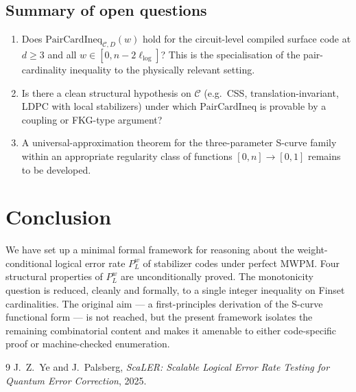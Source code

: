 \documentclass[11pt]{article}
\theoremstyle{definition}
\theoremstyle{remark}
\begin{document}
\subsection{Summary of open questions}

\begin{enumerate}
\item Does $\mathrm{PairCardIneq}_{\mathcal{C}, D}(w)$ hold for
the circuit-level compiled surface code at $d \geq 3$ and all
$w \in [0, n - 2\ell_{\log}]$?  This is the specialisation of the
pair-cardinality inequality to the physically relevant setting.
\item Is there a clean structural hypothesis on $\mathcal{C}$
(e.g.\ CSS, translation-invariant, LDPC with local stabilizers)
under which $\mathrm{PairCardIneq}$ is provable by a coupling or
FKG-type argument?
\item A universal-approximation theorem for the three-parameter
S-curve family within an appropriate regularity class of functions
$[0, n] \to [0, 1]$ remains to be developed.
\end{enumerate}

\section{Conclusion}

We have set up a minimal formal framework for reasoning about the
weight-conditional logical error rate $P_L^w$ of stabilizer codes
under perfect MWPM.  Four structural properties of $P_L^w$ are
unconditionally proved.  The monotonicity question is reduced,
cleanly and formally, to a single integer inequality on Finset
cardinalities.  The original aim --- a first-principles derivation
of the S-curve functional form --- is not reached, but the
present framework isolates the remaining combinatorial content and
makes it amenable to either code-specific proof or machine-checked
enumeration.

\begin{thebibliography}{9}
J.\ Z.\ Ye and J.\ Palsberg,
\emph{ScaLER: Scalable Logical Error Rate Testing for Quantum Error
Correction},
2025.
\end{thebibliography}
\end{document}
